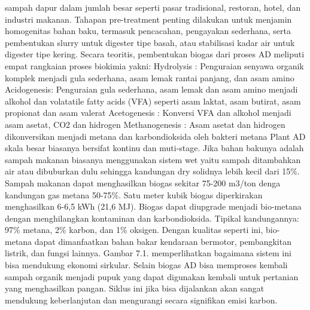 \documentclass[
  letterpaper,
  DIV=11,
  numbers=noendperiod]{scrreprt}
\begin{document}
sampah dapur dalam jumlah besar seperti pasar tradisional, restoran,
hotel, dan industri makanan. Tahapan pre-treatment penting dilakukan
untuk menjamin homogenitas bahan baku, termasuk pencacahan, pengayakan
sederhana, serta pembentukan slurry untuk digester tipe basah, atau
stabilisasi kadar air untuk digester tipe kering. Secara teoritis,
pembentukan biogas dari proses AD meliputi empat rangkaian proses
biokimia yakni: Hydrolysis : Penguraian senyawa organik komplek menjadi
gula sederhana, asam lemak rantai panjang, dan asam amino Acidogenesis:
Penguraian gula sederhana, asam lemak dan asam amino menjadi alkohol dan
volatatile fatty acids (VFA) seperti asam laktat, asam butirat, asam
propionat dan asam valerat Acetogenesis : Konversi VFA dan alkohol
menjadi asam asetat, CO2 dan hidrogen Methanogenesis : Asam asetat dan
hidrogen dikonversikan menjadi metana dan karbondioksida oleh bakteri
metana Plant AD skala besar biasanya bersifat kontinu dan muti-stage.
Jika bahan bakunya adalah sampah makanan biasanya menggunakan sistem wet
yaitu sampah ditambahkan air atau dibuburkan dulu sehingga kandungan dry
solidnya lebih kecil dari 15\%. Sampah makanan dapat menghasilkan biogas
sekitar 75-200 m3/ton denga kandungan gas metana 50-75\%. Satu meter
kubik biogas diperkirakan menghasilkan 6-6,5 kWh (21,6 MJ). Biogas dapat
diupgrade menjadi bio-metana dengan menghilangkan kontaminan dan
karbondioksida. Tipikal kandungannya: 97\% metana, 2\% karbon, dan 1\%
oksigen. Dengan kualitas seperti ini, bio-metana dapat dimanfaatkan
bahan bakar kendaraan bermotor, pembangkitan listrik, dan fungsi
lainnya. Gambar 7.1. memperlihatkan bagaimana sistem ini bisa mendukung
ekonomi sirkular. Selain biogas AD bisa memproses kembali sampah organik
menjadi pupuk yang dapat digunakan kembali untuk pertanian yang
menghasilkan pangan. Siklus ini jika bisa dijalankan akan sangat
mendukung keberlanjutan dan mengurangi secara signifikan emisi karbon.
\end{document}
